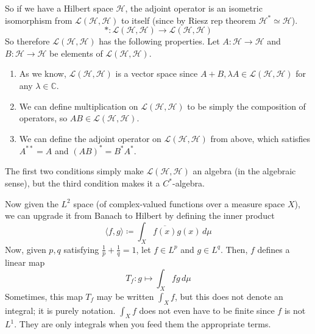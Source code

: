 	So if we have a Hilbert space $\mathcal{H}$, the adjoint operator is an isometric isomorphism from $\mathcal{L}(\mathcal{H}, \mathcal{H})$ to itself (since by Riesz rep theorem $\mathcal{H}^* \simeq \mathcal{H}$). 
	\begin{equation}
	  \ast : \mathcal{L}(\mathcal{H}, \mathcal{H}) \to \mathcal{L}(\mathcal{H}, \mathcal{H})
	\end{equation}
	So therefore $\mathcal{L}(\mathcal{H}, \mathcal{H})$ has the following properties. Let $A: \mathcal{H} \to \mathcal{H}$ and $B: \mathcal{H} \to \mathcal{H}$ be elements of $\mathcal{L}(\mathcal{H}, \mathcal{H})$. 
	\begin{enumerate}
			\item As we know, $\mathcal{L}(\mathcal{H}, \mathcal{H})$ is a vector space since $A + B, \lambda A \in \mathcal{L}(\mathcal{H}, \mathcal{H})$ for any $\lambda \in \mathbb{C}$. 
			\item We can define multiplication on $\mathcal{L}(\mathcal{H}, \mathcal{H})$ to be simply the composition of operators, so $AB \in \mathcal{L}(\mathcal{H}, \mathcal{H})$. 
			\item We can define the adjoint operator on $\mathcal{L}(\mathcal{H}, \mathcal{H})$ from above, which satisfies $A^{**} = A$ and $(AB)^* = B^* A^*$. 
	\end{enumerate}
	The first two conditions simply make $\mathcal{L}(\mathcal{H}, \mathcal{H})$ an algebra (in the algebraic sense), but the third condition makes it a $C^*$-algebra. 

	Now given the $L^2$ space (of complex-valued functions over a measure space $X$), we can upgrade it from Banach to Hilbert by defining the inner product 
	\begin{equation}
		\langle f, g \rangle \coloneqq \int_X \overline{f(x)} g(x) \, d\mu
	\end{equation}
	Now, given $p, q$ satisfying $\frac{1}{p} + \frac{1}{q} = 1$, let $f \in L^p$ and $g \in L^q$. Then, $f$ defines a linear map 
	\begin{equation}
		T_f: g \mapsto \int_X f g \, d\mu 
	\end{equation}
	Sometimes, this map $T_f$ may be written $\int_X f$, but this does not denote an integral; it is purely notation. $\int_X f$ does not even have to be finite since $f$ is not $L^1$. They are only integrals when you feed them the appropriate terms. 

